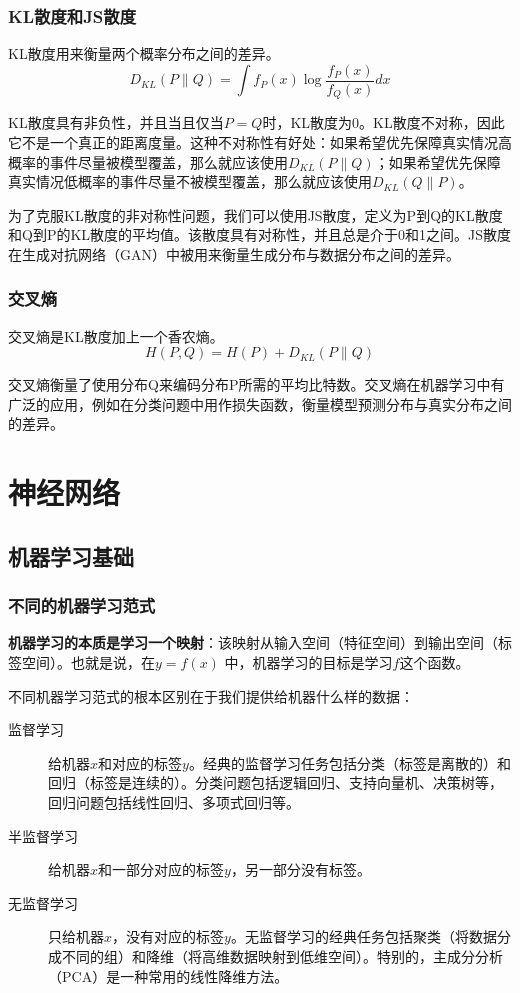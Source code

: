 \documentclass[aspectratio=1610]{ctexbeamer}
\begin{document}
\begin{frame}
    \frametitle{KL散度和JS散度}

    KL散度用来衡量两个概率分布之间的差异。
    \[D_{KL}(P \parallel Q) = \int f_P(x) \log \frac{f_P(x)}{f_Q(x)} dx\]
    
    KL散度具有非负性，并且当且仅当$P=Q$时，KL散度为0。KL散度不对称，因此它不是一个真正的距离度量。这种不对称性有好处：如果希望优先保障真实情况高概率的事件尽量被模型覆盖，那么就应该使用$D_{KL}(P \parallel Q)$；如果希望优先保障真实情况低概率的事件尽量不被模型覆盖，那么就应该使用$D_{KL}(Q \parallel P)$。
    
    \vspace{1em}

    为了克服KL散度的非对称性问题，我们可以使用JS散度，定义为P到Q的KL散度和Q到P的KL散度的平均值。该散度具有对称性，并且总是介于0和1之间。JS散度在生成对抗网络（GAN）中被用来衡量生成分布与数据分布之间的差异。

\end{frame}

\begin{frame}
    \frametitle{交叉熵}

    交叉熵是KL散度加上一个香农熵。\[H(P, Q) = H(P) + D_{KL}(P \parallel Q)\]
    
    交叉熵衡量了使用分布Q来编码分布P所需的平均比特数。交叉熵在机器学习中有广泛的应用，例如在分类问题中用作损失函数，衡量模型预测分布与真实分布之间的差异。

\end{frame}

\section{神经网络}

\subsection{机器学习基础}

\begin{frame}
    \frametitle{不同的机器学习范式}

    \textbf{机器学习的本质是学习一个映射}：该映射从输入空间（特征空间）到输出空间（标签空间）。也就是说，在$y = f(x)$ 中，机器学习的目标是学习$f$这个函数。

    \vspace{1em}
    不同机器学习范式的根本区别在于我们提供给机器什么样的数据：
    \begin{description}
        \item[监督学习] 给机器$x$和对应的标签$y$。经典的监督学习任务包括分类（标签是离散的）和回归（标签是连续的）。分类问题包括逻辑回归、支持向量机、决策树等，回归问题包括线性回归、多项式回归等。
        \item[半监督学习] 给机器$x$和一部分对应的标签$y$，另一部分没有标签。
        \item[无监督学习] 只给机器$x$，没有对应的标签$y$。无监督学习的经典任务包括聚类（将数据分成不同的组）和降维（将高维数据映射到低维空间）。特别的，主成分分析（PCA）是一种常用的线性降维方法。
    \end{description}

\end{frame}
\end{document}
